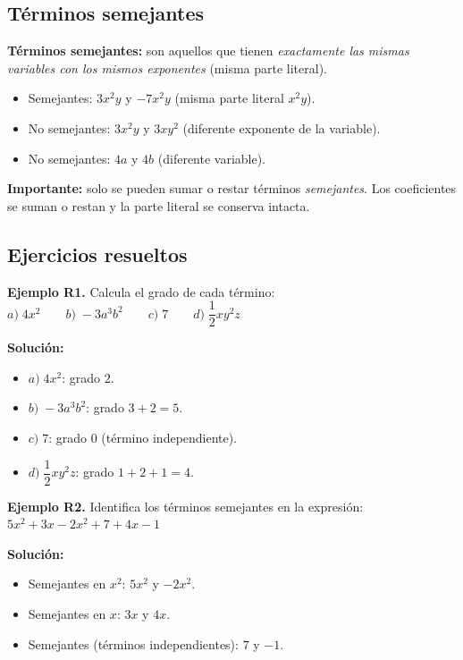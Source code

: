 \documentclass[12pt, letterpaper]{article}
\begin{document}
\subsection{Términos semejantes}

\begin{cuadroteoria}
  \textbf{Términos semejantes:} son aquellos que tienen \emph{exactamente las mismas variables con los mismos exponentes} (misma parte literal).

  \begin{itemize}[leftmargin=*]
    \item Semejantes: $3x^2y$ y $-7x^2y$ (misma parte literal $x^2y$).
    \item No semejantes: $3x^2y$ y $3xy^2$ (diferente exponente de la variable).
    \item No semejantes: $4a$ y $4b$ (diferente variable).
  \end{itemize}

  \textbf{Importante:} solo se pueden sumar o restar términos \emph{semejantes}. Los coeficientes se suman o restan y la parte literal se conserva intacta.
\end{cuadroteoria}

\subsection{Ejercicios resueltos}

\textbf{Ejemplo R1.} Calcula el grado de cada término: $a) \; 4x^2 \qquad b) \; -3a^3b^2 \qquad c) \; 7 \qquad d) \; \dfrac{1}{2}xy^2z$

\begin{cuadrosolucion}
  \textbf{Solución:}
  \begin{itemize}
    \item $a) \; 4x^2$: grado $2$.
    \item $b) \; -3a^3b^2$: grado $3 + 2 = 5$.
    \item $c) \; 7$: grado $0$ (término independiente).
    \item $d) \; \dfrac{1}{2}xy^2z$: grado $1 + 2 + 1 = 4$.
  \end{itemize}
\end{cuadrosolucion}

\newpage %

\textbf{Ejemplo R2.} Identifica los términos semejantes en la expresión: $5x^2 + 3x - 2x^2 + 7 + 4x - 1$

\begin{cuadrosolucion}
  \textbf{Solución:}
  \begin{itemize}
    \item Semejantes en $x^2$: $5x^2$ y $-2x^2$.
    \item Semejantes en $x$: $3x$ y $4x$.
    \item Semejantes (términos independientes): $7$ y $-1$.
  \end{itemize}
\end{cuadrosolucion}
\end{document}
